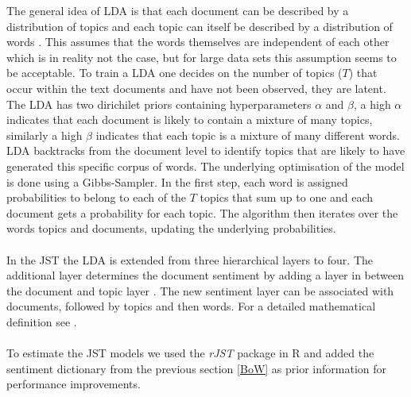 The general idea of LDA is that each document can be described by a distribution of topics and each topic can itself be described by a distribution of words \citep{blei2003latent}. This assumes that the words themselves are independent of each other which is in reality not the case, but for large data sets this assumption seems to be acceptable. To train a LDA one decides on the number of topics ($T$) that occur within the text documents and have not been observed, they are latent. The LDA has two dirichilet priors containing hyperparameters $\alpha$ and $\beta$, a high $\alpha$ indicates that each document is likely to contain a mixture of many topics, similarly a high $\beta$ indicates that each topic is a mixture of many different words. LDA backtracks from the document level to identify topics that are likely to have generated this specific corpus of words. The underlying optimisation of the model is done using a Gibbs-Sampler. In the first step, each word is assigned probabilities to belong to each of the $T$ topics that sum up to one and each document gets a probability for each topic. The algorithm then iterates over the words topics and documents, updating the underlying probabilities. \\ \\
In the JST the LDA is extended from three hierarchical layers to four. The additional layer determines the document sentiment by adding a layer in between the document and topic layer \citep{lin2009joint}. The new sentiment layer can be associated with documents, followed by topics and then words. For a detailed mathematical definition see \citet{lin2009joint}. \\ \\
To estimate the JST models we used the \textit{rJST} package in R \citep{rJST} and added the sentiment dictionary from the previous section \ref{BoW} as prior information for performance improvements.

